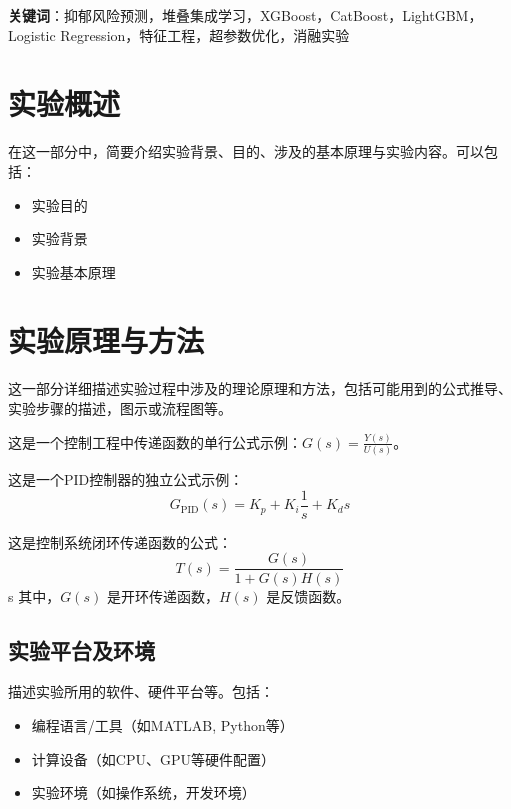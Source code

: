 \documentclass[a4paper]{article}
\begin{document}
\textbf{关键词}：抑郁风险预测，堆叠集成学习，XGBoost，CatBoost，LightGBM，Logistic Regression，特征工程，超参数优化，消融实验

\newpage


\begin{center}
\tableofcontents\label{c}
\end{center}
\newpage

\section{实验概述}

在这一部分中，简要介绍实验背景、目的、涉及的基本原理与实验内容。可以包括：
\begin{itemize}
    \item 实验目的
    \item 实验背景
    \item 实验基本原理
\end{itemize}

\section{实验原理与方法}

这一部分详细描述实验过程中涉及的理论原理和方法，包括可能用到的公式推导、实验步骤的描述，图示或流程图等。

这是一个控制工程中传递函数的单行公式示例：$G(s) = \frac{Y(s)}{U(s)}$。

这是一个PID控制器的独立公式示例：
\[
G_{\text{PID}}(s) = K_p + K_i \frac{1}{s} + K_d s
\]


这是控制系统闭环传递函数的公式：
\[
T(s) = \frac{G(s)}{1 + G(s)H(s)}
\]
s
其中，$G(s)$ 是开环传递函数，$H(s)$ 是反馈函数。


\subsection{实验平台及环境}
描述实验所用的软件、硬件平台等。包括：
\begin{itemize}
    \item 编程语言/工具（如MATLAB, Python等）
    \item 计算设备（如CPU、GPU等硬件配置）
    \item 实验环境（如操作系统，开发环境）
\end{itemize}
\end{document}
